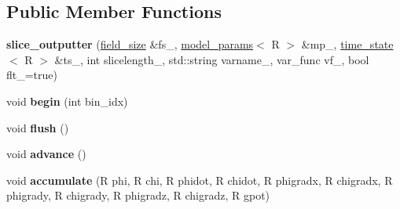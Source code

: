 \subsection*{Public Member Functions}
\begin{DoxyCompactItemize}
\item 
\hypertarget{classslice__outputter_a86972e0f2bbad749be1cfa7aee5c0ca1}{
{\bfseries slice\_\-outputter} (\hyperlink{structfield__size}{field\_\-size} \&fs\_\-, \hyperlink{structmodel__params}{model\_\-params}$<$ R $>$ \&mp\_\-, \hyperlink{structtime__state}{time\_\-state}$<$ R $>$ \&ts\_\-, int slicelength\_\-, std::string varname\_\-, var\_\-func vf\_\-, bool flt\_\-=true)}
\label{classslice__outputter_a86972e0f2bbad749be1cfa7aee5c0ca1}

\item 
\hypertarget{classslice__outputter_a4a9c77e60f5bc6b7f83e2063e5d6e334}{
void {\bfseries begin} (int bin\_\-idx)}
\label{classslice__outputter_a4a9c77e60f5bc6b7f83e2063e5d6e334}

\item 
\hypertarget{classslice__outputter_aa9fe19a69c103855544940ad2b32c01a}{
void {\bfseries flush} ()}
\label{classslice__outputter_aa9fe19a69c103855544940ad2b32c01a}

\item 
\hypertarget{classslice__outputter_a5d9762160a8e538880df5ff44b84f3c6}{
void {\bfseries advance} ()}
\label{classslice__outputter_a5d9762160a8e538880df5ff44b84f3c6}

\item 
\hypertarget{classslice__outputter_a8ec331e66afb581d8d70bd5630e7f857}{
void {\bfseries accumulate} (R phi, R chi, R phidot, R chidot, R phigradx, R chigradx, R phigrady, R chigrady, R phigradz, R chigradz, R gpot)}
\label{classslice__outputter_a8ec331e66afb581d8d70bd5630e7f857}

\end{DoxyCompactItemize}
